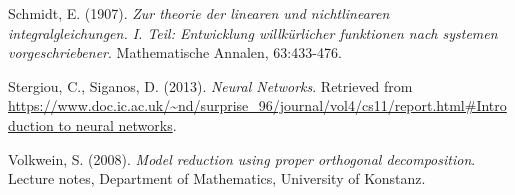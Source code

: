\documentclass{elsarticle}
\numberwithin{equation}{section}
\theoremstyle{theorem}
\theoremstyle{definition}
\theoremstyle{remark}
\theoremstyle{proposition}
\numberwithin{figure}{section}
\begin{document}
\begin{thebibliography}{50}
		Schmidt, E. (1907). \emph{Zur theorie der linearen und nichtlinearen integralgleichungen. I. Teil: Entwicklung willk\"urlicher funktionen nach systemen vorgeschriebener}. Mathematische Annalen, 63:433-476.
		
		Stergiou, C., Siganos, D. (2013). \emph{Neural Networks}. Retrieved from \url{https://www.doc.ic.ac.uk/~nd/surprise_96/journal/vol4/cs11/report.html#Introduction to neural networks}.
		
		Volkwein, S. (2008). \emph{Model reduction using proper orthogonal decomposition}. Lecture notes, Department of Mathematics, University of Konstanz.
		
		
	\end{thebibliography}
	
\end{document}
